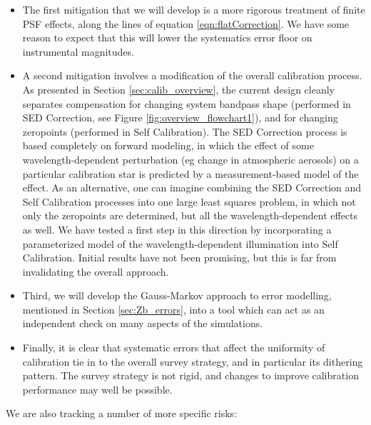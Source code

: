 \documentclass[12pt,preprint]{aastex}
\begin{document}
\begin{itemize}
\item{The first mitigation that we will develop is a more rigorous treatment of finite PSF effects, 
along the lines of equation \ref{eqn:flatCorrection}.  We have some reason to expect that this will lower the
systematics error floor on instrumental magnitudes.}

\item{A second mitigation involves a modification of the overall calibration process.  
As presented in Section \ref{sec:calib_overview}, the current design cleanly separates compensation for changing system
bandpass shape (performed in SED Correction, see Figure \ref{fig:overview_flowchart1}), and for changing zeropoints
(performed in Self Calibration).  The SED Correction process is based completely on forward modeling,
in which the effect of some wavelength-dependent perturbation (eg change in atmospheric aerosols) on
a particular calibration star is predicted by a measurement-based model of the effect.  As
an alternative, one can imagine combining the SED Correction and Self Calibration processes into one
large least squares problem, in which not only the zeropoints are determined, but all the 
wavelength-dependent effects as well.  We have tested a first step in this direction by incorporating
a parameterized model of the wavelength-dependent illumination into Self Calibration.  Initial 
results have not been promising, but this is far from invalidating the overall approach.}

\item{Third, we will develop the Gauss-Markov approach to error modelling, mentioned in Section \ref{sec:Zb_errors},
into a tool which can act as an independent check on many aspects of the simulations.}

\item{Finally, it is clear that systematic errors that affect the uniformity of calibration tie in to the overall
survey strategy, and in particular its dithering pattern.  The survey strategy is not rigid, and changes
to improve calibration performance may well be possible.}

\end{itemize}

We are also tracking a number of more specific risks:
\end{document}
